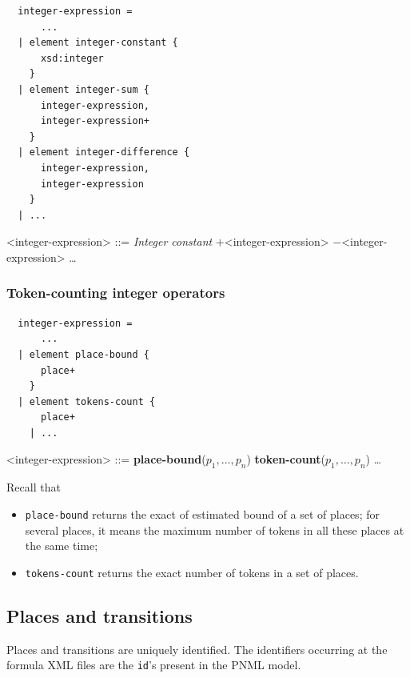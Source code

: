 \documentclass[10pt,english,a4paper]{article}
\newcommand\atomplacebnd[1]  {\textbf{place-bound}(#1)}
\newcommand\atomtokenscnt[1] {\textbf{token-count}(#1)}
\newcommand\exprplus         {\boldmath$+$\xspace}
\newcommand\exprminus        {\boldmath$-$\xspace}
\begin{document}
\begin{multicols}{2}
\begin{lstlisting}
  integer-expression =
      ...
  | element integer-constant {
      xsd:integer
    }
  | element integer-sum {
      integer-expression,
      integer-expression+
    }
  | element integer-difference {
      integer-expression,
      integer-expression
    }
  | ...
\end{lstlisting}
\columnbreak
\setlength{\grammarindent}{6em}
\begin{grammar}
<integer-expression> ::=
     \textit{Integer constant}
 \exprplus <integer-expression>
 \exprminus <integer-expression>
\alt \ldots
\end{grammar}
\end{multicols}

\subsubsection{Token-counting integer operators}

\begin{multicols}{2}
\begin{lstlisting}
  integer-expression =
      ...
  | element place-bound {
      place+
    }
  | element tokens-count {
      place+
    | ...
\end{lstlisting}
\columnbreak
\begin{grammar}
<integer-expression> ::=
     \atomplacebnd{$p_1, \ldots, p_n$}
\alt \atomtokenscnt{$p_1, \ldots, p_n$}
\alt \ldots
\end{grammar}
\end{multicols}

Recall that
\begin{itemize}
  \item \lstinline!place-bound! returns the exact of estimated bound of a set of places;
    for several places, it means the maximum number of tokens in all these places at the same
    time;
  \item \lstinline!tokens-count! returns the exact number of tokens in a set of places.
\end{itemize}

\subsection{Places and transitions}

Places and transitions are uniquely identified. The identifiers occurring at
the formula XML files are the \texttt{id}'s present in the PNML model.
\end{document}
